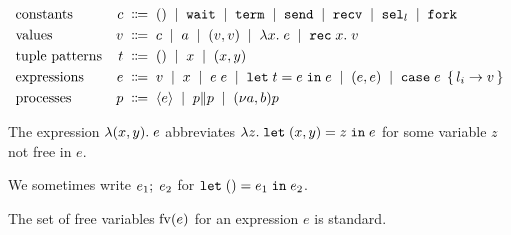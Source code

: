 \begin{align*}
  &\text{constants}&
                     c \grmdef & \EUnit \grmor \EkwWait \grmor \EkwTerm \grmor \EkwSend \grmor \EkwRecv \grmor \EkwSelect[l] \grmor \EkwFork \\
  &\text{values}&
                   v \grmdef&
    c                        \grmor
    a                        \grmor
    \EPair v v            \grmor
    \ELam x e           \grmor
    \ERec x v
  \\
  &\text{tuple patterns}&
                          t \grmdef& \EUnit \grmor x \grmor \EPair x y
  \\
  &\text{expressions}&
                       e \grmdef&
    v                       \grmor
    x                       \grmor
    \EApp e e           \grmor
    \ELet t e e              \grmor
    \EPair e e                  \grmor
         \ECase e { l_i \rightarrow v }
  \\
  & \text{processes}&
  p \grmdef&
    \PExp e                 \grmor
    \PPar p p               \grmor
    \PScope p
\end{align*}

The expression $\lambda (x,y).\; e$ abbreviates $\lambda z.\; \mathtt{let}\; (x,y) = z \;\mathtt{in}\; e$
for some variable $z$ not free in $e$.

We sometimes write $e_1;\; e_2$ for $\mathtt{let}\; () = e_1 \;\mathtt{in}\; e_2$.

The set of free variables $\mathrm{fv}(e)$ for an expression $e$ is standard.


